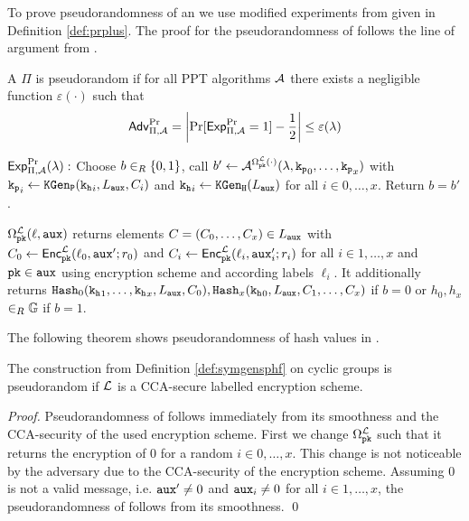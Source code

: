 \noindent
To prove pseudorandomness of an \SPHFF we use modified experiments from \cite{Gennaro2003} given in Definition \ref{def:prplus}.
The proof for the pseudorandomness of \SPHFF follows the line of argument from \cite{Gennaro2003}.

\begin{definition}\label{def:prplus}
A \SPHFF $\Pi$ is pseudorandom if for all PPT algorithms $\mathcal{A}$ there exists a negligible function $\varepsilon(\cdot)$ such that
\[\mathsf{Adv}_{\Pi,\mathcal{A}}^{\Pr}=\left|\Pr[\mathsf{Exp}_{\Pi,\mathcal{A}}^{\Pr}=1] - \frac12 \right|\leq \varepsilon(\lambda)\]

\noindent
$\mathsf{Exp}_{\Pi,\mathcal{A}}^{\Pr}(\lambda):$ Choose $b\in_R\{0,1\}$, call $b'\gets\mathcal{A}^{\Omega^{\mathcal{L}}_\mathtt{pk}(\cdot)}(\lambda,\mathtt{k_p}_0,\dots,\mathtt{k_p}_x)$ with $\mathtt{k_p}_i\gets\mathtt{KGen_P}(\mathtt{k_h}_i,L_\mathtt{aux},C_i)$ and $\mathtt{k_h}_i\gets\mathtt{KGen_H}(L_\mathtt{aux})$ for all $i\in 0,\dots,x$.
Return $b=b'$.

\begin{description}
	\item $\Omega^{\mathcal{L}}_\mathtt{pk}(\ell,\mathtt{aux})$ returns elements $C=(C_0,\dots,C_x)\in L_\mathtt{aux}$ with $C_0\gets\mathsf{Enc}^\mathcal{L}_\mathtt{pk}(\ell_0,\allowbreak\mathtt{aux}';r_0)$ and $C_i\gets\mathsf{Enc}^\mathcal{L}_\mathtt{pk}\allowbreak(\ell_i,\mathtt{aux}'_i;r_i)$ for all $i\in1,\dots,x$ and $\mathtt{pk}\in\mathtt{aux}$ using encryption scheme \cL and according labels $\ell_i$.
	It additionally returns $\mathtt{Hash}_0(\mathtt{k_h}_1,\dots,\allowbreak\mathtt{k_h}_x,L_\mathtt{aux},C_0),\mathtt{Hash}_x(\mathtt{k_h}_0,\allowbreak L_\mathtt{aux},C_1,\dots,C_x)$ if $b=0$ or $h_0,h_x$ $\in_R\mathbb{G}$ if $b=1$.
\end{description}
\end{definition}

\noindent
The following theorem shows pseudorandomness of hash values in \SPHFF.

\begin{theorem}\label{theo:prsphff}
The \SPHFF construction from Definition \ref{def:symgensphf} on cyclic groups is pseudorandom if $\mathcal{L}$ is a CCA-secure labelled encryption scheme.
\end{theorem}

\begin{proof}
Pseudorandomness of \SPHFF follows immediately from its smoothness and the CCA-security of the used encryption scheme.
First we change $\Omega^\mathcal{L}_\mathtt{pk}$ such that it returns the encryption of $0$ for a random $i\in0,\dots,x$.
This change is not noticeable by the adversary due to the CCA-security of the encryption scheme.
Assuming $0$ is not a valid message, i.e. $\mathtt{aux}'\not=0$ and $\mathtt{aux}_i\not=0$ for all $i\in1,\dots,x$, the pseudorandomness of \SPHFF follows from its smoothness.
\qed
\end{proof}

